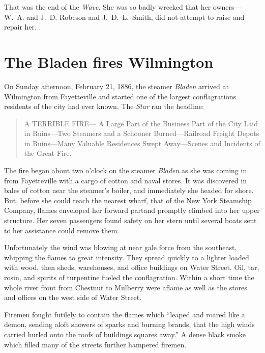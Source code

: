 \documentclass[11pt, a5paper, openright]{book}
\newcommand{\steamer}[1]{\textit{#1}\index{#1,~steamer}}
\begin{document}
That was the end of the \steamer{Wave}.  She was so badly wrecked that
her owners---W.~A. and
J.~D. Robeson and
J.~D.~L.~Smith, did not attempt to raise
and repair her.  \citep[3-13-1885]{ws}.\par

\section{The Bladen fires Wilmington}

On Sunday afternoon, February 21, 1886, the steamer \steamer{Bladen}
arrived at Wilmington from Fayetteville and started one of the largest
conflagrations residents of the city had ever known.  The
\textit{Star} ran the headline:

\begin{quote}
  \uppercase{A Terrible Fire}---\newline
  A Large Part of the Business Part of the City Laid in Ruins---Two
  Steamers and a Schooner Burned---Railroad Freight Depots in
  Ruins---Many Valuable Residences Swept Away---Scenes and Incidents
  of the Great Fire.
\end{quote}

The fire began about two o'clock on the steamer \steamer{Bladen} as
she was coming in from Fayetteville with a cargo of cotton and naval
stores.  It was discovered in bales of cotton near the steamer's
boiler, and immediately she headed for shore.  But, before she could
reach the nearest wharf, that of the New York Steamship Company,
flames enveloped her forward partand promptly climbed into her upper
structure.  Her seven passengers found safety on her stern until
several boats sent to her assistance could remove them.\par

Unfortunately the wind was blowing at near gale force from the
southeast, whipping the flames to great intensity.  They spread
quickly to a lighter loaded with wood, then sheds, warehouses, and
office buildings on Water Street.  Oil, tar, rosin, and spirits of
turpentine fueled the conflagration.  Within a short time the whole
river front from Chestnut to Mulberry were aflame as well as the
stores and offices on the west side of Water Street.\par

Firemen fought futilely to contain the flames which ``leaped and
roared like a demon, sending aloft showers of sparks and burning
brands, that the high winds carried hurled onto the roofs of buildings
squares away.''  A dense black smoke which filled many of the streets
further hampered firemen.\par
\end{document}
